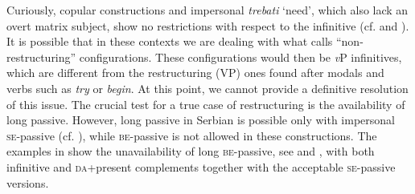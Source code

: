 \documentclass[output=paper,
modfonts,
newtxmath,
hidelinks,
]{langscibook}
\begin{document}
\ea \label{ex15}
	\z
\z

\noindent Curiously, copular constructions and impersonal \textit{trebati} `need', which also lack an overt matrix subject, show no restrictions with respect to the infinitive (cf.  and ). It is possible that in these contexts we are dealing with what \citet{Wurmbrand2003} calls “non-restructuring” configurations. These configurations would then be \textit{v}P infinitives, which are different from the restructuring (VP) ones found after modals and verbs such as \textit{try} or \textit{begin}. At this point, we cannot provide a definitive resolution of this issue. The crucial test for a true case of restructuring is the availability of long passive. However, long passive in Serbian is possible only with impersonal \textsc{se}-passive (cf. \citealt{TodorovicWurmbrand2015}), while \textsc{be}-passive is not allowed in these constructions. The examples in  show the unavailability of long \textsc{be-}passive, see  and , with both infinitive and \textsc{da}+present complements together with the acceptable \textsc{se-}passive versions.
\end{document}
